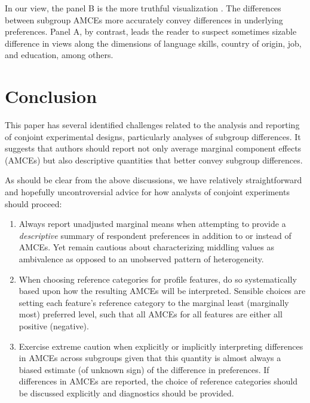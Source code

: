 \documentclass[a4paper,12pt]{article}\usepackage[]{graphicx}\usepackage[]{color}
\begin{document}
In our view, the panel B is the more truthful visualization \citep{Cairo2016}. The differences between subgroup AMCEs more accurately convey differences in underlying preferences. Panel A, by contrast, leads the reader to suspect sometimes sizable difference in views along the dimensions of language skills, country of origin, job, and education, among others. 




\section{Conclusion}\label{sec:conclusion}

This paper has several identified challenges related to the analysis and reporting of conjoint experimental designs, particularly analyses of subgroup differences. It suggests that authors should report not only average marginal component effects (AMCEs) but also descriptive quantities that better convey subgroup differences.

As should be clear from the above discussions, we have relatively straightforward and hopefully uncontroversial advice for how analysts of conjoint experiments should proceed:

\begin{enumerate}
\item Always report unadjusted marginal means when attempting to provide a \textit{descriptive} summary of respondent preferences in addition to or instead of AMCEs. Yet remain cautious about characterizing middling values as ambivalence as opposed to an unobserved pattern of heterogeneity.

\item When choosing reference categories for profile features, do so systematically based upon how the resulting AMCEs will be interpreted. Sensible choices are setting each feature's reference category to the marginal least (marginally most) preferred level, such that all AMCEs for all features are either all positive (negative).

\item Exercise extreme caution when explicitly or implicitly interpreting differences in AMCEs across subgroups given that this quantity is almost always a biased estimate (of unknown sign) of the difference in preferences. If differences in AMCEs are reported, the choice of reference categories should be discussed explicitly and diagnostics should be provided.
\end{enumerate}
\end{document}
